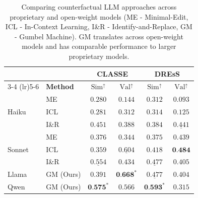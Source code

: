 \documentclass[11pt]{article}
\begin{document}
\begin{table}[t]
\small
\centering
\setlength{\tabcolsep}{4pt}
\begin{tabular}{ll  cc  cc}
\toprule
& & \multicolumn{2}{c}{\textbf{CLASSE}} & \multicolumn{2}{c}{\textbf{DREsS}} \\
\cmidrule(lr){3-4} \cmidrule(lr){5-6}
\multirow{-2}{*}{\textbf{Model}} & \multirow{-2}{*}{\textbf{Method}} & $\text{Sim}^\uparrow$ & $\text{Val}^\uparrow$ & $\text{Sim}^\uparrow$ & $\text{Val}^\uparrow$ \\
\midrule
\multirow{3}{*}{Haiku}
  & ME %
    & $0.280$ & $0.144$
    & $0.312$ & $0.093$ \\
  & ICL
    & $0.281$ & $0.312$
    & $0.314$ & $0.125$ \\
  & I\&R %
    & $0.451$ & $0.388$
    & $0.384$ & $\underline{0.441}$ \\
\midrule
\multirow{3}{*}{Sonnet}
  & ME %
    & $0.376$ & $0.344$
    & $0.375$ & $0.439$ \\
  & ICL
    & $0.359$ & $\underline{0.604}$
    & $0.418$ & $\textbf{0.484}$ \\
  & I\&R %
    & $\underline{0.554}$ & $0.434$
    & $\underline{0.477}$ & $0.405$ \\
\midrule
\multirow{1}{*}{Llama}
 & GM (Ours)
    & $0.391$ & $\textbf{0.668}^{*}$
    & $\underline{0.477}$ & $0.404$ \\
\midrule
\multirow{1}{*}{Qwen}
  & GM (Ours)
    & $\textbf{0.575}^{*}$ & $0.566$
    & $\textbf{0.593}^{*}$ & $0.315$ \\
\bottomrule
\end{tabular}
\caption{Comparing counterfactual LLM approaches across proprietary and open-weight models (ME - Minimal-Edit, ICL - In-Context Learning, I\&R - Identify-and-Replace, GM - Gumbel Machine). GM translates across open-weight models and has comparable performance to larger proprietary models.}
\label{tab:gm_vs_closed}
\end{table}
\end{document}
